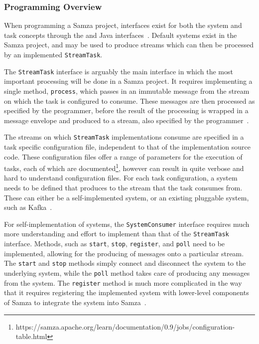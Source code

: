 \subsubsection{Programming Overview}

When programming a Samza project, interfaces exist for both the system and task concepts through the 
and  Java interfaces~\cite{Samza:doc}. Default systems exist in the Samza project, and may be
used to produce streams which can then be processed by an implemented \texttt{StreamTask}.

The \texttt{StreamTask} interface is arguably the main interface in which the most important processing will be done in
a Samza project. It requires implementing a single method, \texttt{process}, which passes in an immutable message from the stream
on which the task is configured to consume. These messages are then processed as specified by the programmer, before the
result of the processing is wrapped in a message envelope and produced to a stream, also specified by the programmer~\cite{Samza:doc}.

The streams on which \texttt{StreamTask} implementations consume are specified in a task specific configuration file,
independent to that of the implementation source code. These configuration files offer a range of parameters for the
execution of tasks, each of which are documented\footnote{https://samza.apache.org/learn/documentation/0.9/jobs/configuration-table.html},
however can result in quite verbose and hard to understand configuration files. For each task configuration, a system
needs to be defined that produces to the stream that the task consumes from. These can either be a self-implemented
system, or an existing pluggable system, such as Kafka~\cite{Samza:doc}.

For self-implementation of systems, the \texttt{SystemConsumer} interface requires much more understanding and effort to
implement than that of the \texttt{StreamTask} interface. Methods, such as \texttt{start}, \texttt{stop}, \texttt{register},
and \texttt{poll} need to be implemented, allowing for the producing of messages onto a particular stream. The \texttt{start}
and \texttt{stop} methods simply connect and disconnect the system to the underlying system, while the \texttt{poll}
method takes care of producing any messages from the system. The \texttt{register} method is much more complicated in the
way that it requires registering the implemented system with lower-level components of Samza to integrate the system into
Samza~\cite{Samza:doc}.

